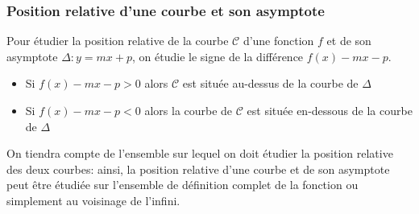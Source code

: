 \subsubsection*{Position relative d'une courbe et son asymptote}
Pour étudier la position relative de la  courbe $\mathcal{C} $ d'une fonction $ f $ et  de  son asymptote $ \Delta : y=mx+p $, on étudie le signe de la différence $ f(x)-mx-p$.
\begin{itemize}
\item  Si $ f(x)-mx-p > 0$ alors  $ \mathcal{C}  $ est  située  au-dessus de la courbe de $ \Delta $ 
\item  Si $ f(x)-mx-p< 0$ alors la courbe de $\mathcal{C}$ est  située  en-dessous de la courbe de $\Delta$ 
\end{itemize}
On tiendra compte de l'ensemble sur lequel on doit étudier la position relative des deux courbes: ainsi, la position relative d'une courbe et de son asymptote peut être étudiée sur l'ensemble de définition complet de la fonction ou simplement au voisinage de l'infini. 
